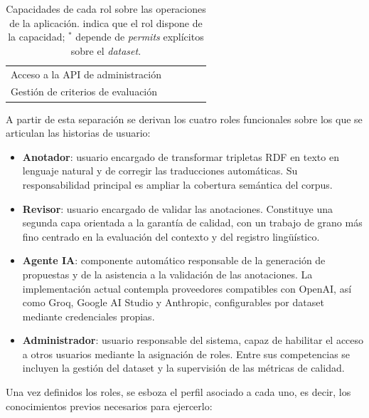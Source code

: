 \begin{table}[ht]
\begin{tabular}{p{5.4cm}cccc}
		Acceso a la API de administración                                    &                   &                  &                        & \checkmark         \\
		Gestión de criterios de evaluación                                   &                   &                  &                        & \checkmark         \\
		\hline
	\end{tabular}
	\caption{Capacidades de cada rol sobre las operaciones de la aplicación.
		\checkmark indica que el rol dispone de la capacidad; $^{*}$ depende de
		\textit{permits} explícitos sobre el \textit{dataset}.}
	\label{tab:roles-permisos}
\end{table}

A partir de esta separación se derivan los cuatro roles funcionales sobre los
que se articulan las historias de usuario:

\begin{itemize}
	\item \textbf{Anotador}: usuario encargado de transformar tripletas RDF en texto en
	      lenguaje natural y de corregir las traducciones automáticas. Su responsabilidad
	      principal es ampliar la cobertura semántica del corpus.
	\item \textbf{Revisor}: usuario encargado de validar las anotaciones. Constituye una
	      segunda capa orientada a la garantía de calidad, con un trabajo de grano más
	      fino centrado en la evaluación del contexto y del registro lingüístico.
	\item \textbf{Agente IA}: componente automático responsable de la generación de
	      propuestas y de la asistencia a la validación de las anotaciones. La
	      implementación actual contempla proveedores compatibles con OpenAI, así como
	      Groq, Google AI Studio y Anthropic, configurables por dataset mediante
	      credenciales propias.
	\item \textbf{Administrador}: usuario responsable del sistema, capaz de habilitar el
	      acceso a otros usuarios mediante la asignación de roles. Entre sus competencias
	      se incluyen la gestión del dataset y la supervisión de las métricas de calidad.
\end{itemize}

Una vez definidos los roles, se esboza el perfil asociado a cada uno, es decir,
los conocimientos previos necesarios para ejercerlo:

